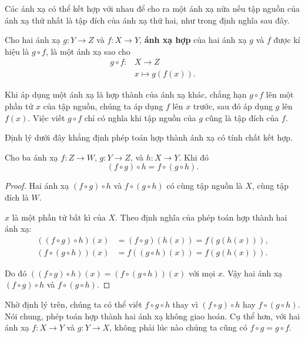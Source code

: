 Các ánh xạ có thể kết hợp với nhau để cho ra một ánh xạ nữa nếu tập nguồn của ánh xạ thứ nhất là tập đích của ánh xạ thứ hai, như trong định nghĩa sau đây.

\begin{definition}
    Cho hai ánh xạ $g: Y\to Z$ và $f: X\to Y$, \textbf{ánh xạ hợp} của hai ánh xạ $g$ và $f$ được kí hiệu là $g\circ f$, là một ánh xạ sao cho
    \begin{align*}
        g\circ f: & X\to Z            \\
                  & x\mapsto g(f(x)).
    \end{align*}
\end{definition}

Khi áp dụng một ánh xạ là hợp thành của ánh xạ khác, chẳng hạn $g\circ f$ lên một phần tử $x$ của tập nguồn, chúng ta áp dụng $f$ lên $x$ trước, sau đó áp dụng $g$ lên $f(x)$. Việc viết $g\circ f$ chỉ có nghĩa khi tập nguồn của $g$ cũng là tập đích của $f$.

Định lý dưới đây khẳng định phép toán hợp thành ánh xạ có tính chất kết hợp.

\begin{theorem}
    Cho ba ánh xạ $f: Z\to W$, $g: Y\to Z$, và $h: X\to Y$. Khi đó
    \[
        (f\circ g)\circ h = f\circ (g\circ h).
    \]
\end{theorem}

\begin{proof}
    Hai ánh xạ $(f\circ g)\circ h$ và $f\circ (g\circ h)$ có cùng tập nguồn là $X$, cùng tập đích là $W$.

    $x$ là một phần tử bất kì của $X$. Theo định nghĩa của phép toán hợp thành hai ánh xạ:
    \begin{align*}
        ((f\circ g)\circ h)(x) & = (f\circ g)(h(x)) = f(g(h(x))), \\
        (f\circ (g\circ h))(x) & = f((g\circ h)(x)) = f(g(h(x))).
    \end{align*}

    Do đó $((f\circ g)\circ h)(x) = (f\circ (g\circ h))(x)$ với mọi $x$. Vậy hai ánh xạ $(f\circ g)\circ h$ và $f\circ (g\circ h)$.
\end{proof}

Nhờ định lý trên, chúng ta có thể viết $f\circ g\circ h$ thay vì $(f\circ g)\circ h$ hay $f\circ (g\circ h)$. Nói chung, phép toán hợp thành hai ánh xạ không giao hoán. Cụ thể hơn, với hai ánh xạ $f: X\to Y$ và $g: Y\to X$, không phải lúc nào chúng ta cũng có $f\circ g = g\circ f$.

